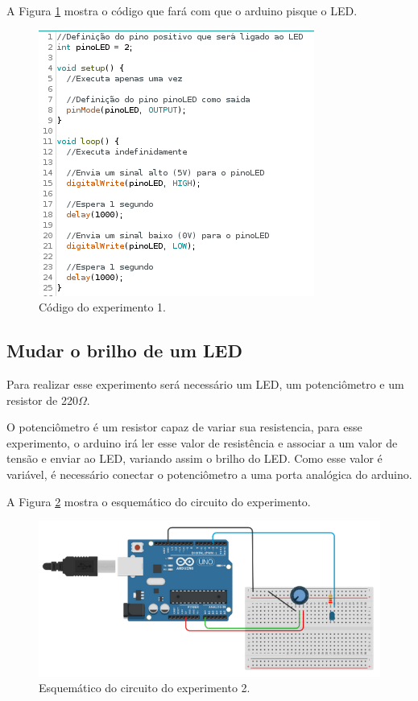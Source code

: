 \documentclass[12pt]{article}
\begin{document}
	A Figura \ref{figExp1PiscarLEDcod} mostra o código que fará com que o arduino pisque o LED.

	\begin{figure}[H]
		\centering
		\includegraphics[scale=0.7]{Imagens/Experimentos/1-PiscarLED/1-PiscarLEDcod.png}
		\caption{Código do experimento 1.}
		\label{figExp1PiscarLEDcod}
	\end{figure}

\subsection{Mudar o brilho de um LED}
	Para realizar esse experimento será necessário um LED, um potenciômetro e um resistor de 220$\Omega$.

	O potenciômetro é um resistor capaz de variar sua resistencia, para esse experimento, o arduino irá ler esse valor de resistência e associar a um valor de tensão e enviar ao LED, variando assim o brilho do LED. Como esse valor é variável, é necessário conectar o potenciômetro a uma porta analógica do arduino.

	A Figura \ref{figExp2BrilhoLEDesq} mostra o esquemático do circuito do experimento.

	\begin{figure}[H]
		\centering
		\includegraphics[scale=0.4]{Imagens/Experimentos/2-brilhoLED/2-brilhoLEDesq.png}
		\caption{Esquemático do circuito do experimento 2.}
		\label{figExp2BrilhoLEDesq}
	\end{figure}
\end{document}
